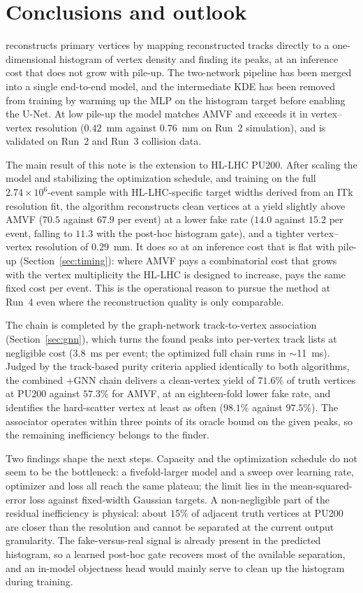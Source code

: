 \section{Conclusions and outlook}
\label{sec:conclusions}

\pvf{} reconstructs primary vertices by mapping reconstructed tracks directly to a
one-dimensional histogram of vertex density and finding its peaks, at an inference
cost that does not grow with pile-up. The two-network pipeline has been merged into
a single end-to-end model, and the intermediate KDE has been removed from training
by warming up the MLP on the histogram target before enabling the U-Net. At low
pile-up the model matches AMVF and exceeds it in vertex--vertex resolution
($0.42$~mm against $0.76$~mm on Run~2 simulation), and is validated on Run~2 and
Run~3 collision data.

The main result of this note is the extension to HL-LHC PU200. After scaling the
model and stabilizing the optimization schedule, and training on the full
$2.74\times10^{6}$-event sample with HL-LHC-specific target widths derived from an
ITk resolution fit, the algorithm reconstructs clean vertices at a yield slightly
above AMVF ($70.5$ against $67.9$ per event) at a lower fake rate ($14.0$ against
$15.2$ per event, falling to $11.3$ with the post-hoc histogram gate), and a tighter
vertex--vertex resolution of $0.29$~mm. It does so at an
inference cost that is flat with pile-up (Section~\ref{sec:timing}): where AMVF pays a
combinatorial cost that grows with the vertex multiplicity the HL-LHC is designed to
increase, \pvf{} pays the same fixed cost per event. This is the operational reason to
pursue the method at Run~4 even where the reconstruction quality is only comparable.

The chain is completed by the graph-network track-to-vertex association
(Section~\ref{sec:gnn}), which turns the found peaks into per-vertex track
lists at negligible cost ($3.8$~ms per event; the optimized full chain runs
in $\sim$11~ms). Judged by the track-based purity criteria applied
identically to both algorithms, the combined \pvf{}+GNN chain delivers a
clean-vertex yield of $71.6\%$ of truth vertices at PU200 against $57.3\%$
for AMVF, at an eighteen-fold lower fake rate, and identifies the
hard-scatter vertex at least as often ($98.1\%$ against $97.5\%$). The
associator operates within three points of its oracle bound on the given
peaks, so the remaining inefficiency belongs to the finder.

Two findings shape the next steps. Capacity and the optimization schedule do not
seem to be the bottleneck: a fivefold-larger model and a sweep over learning rate,
optimizer and loss all reach the same plateau; the limit lies in the
mean-squared-error loss against fixed-width Gaussian targets. A non-negligible
part of the residual inefficiency is physical: about $15\%$ of adjacent truth
vertices at PU200 are closer than the resolution and cannot be separated at the
current output granularity. The fake-versus-real signal is already present in the
predicted histogram, so a learned post-hoc gate recovers most of the available
separation, and an in-model objectness head would mainly serve to clean up the
histogram during training.

